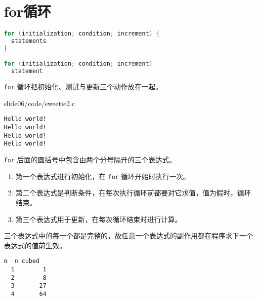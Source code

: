 \section{for循环}
\begin{frame}[fragile]\ft{\secname}
\begin{lstlisting}[language=c,frame=single]
for (initialization; condition; increment) {
  statements
}

for (initialization; condition; increment) 
  statement
\end{lstlisting} 

 \lstinline|for| 循环把初始化、测试与更新三个动作放在一起。

\end{frame}


\begin{frame}[fragile]\ft{\secname}
  
  {slide06/code/sweetie2.c}
\end{frame}


\begin{frame}[fragile]\ft{\secname}
\begin{lstlisting}[backgroundcolor=\color{red!10}]
Hello world!
Hello world!
Hello world!
Hello world!
\end{lstlisting} 
\end{frame}


\begin{frame}[fragile]\ft{\secname}
 \lstinline|for| 后面的圆括号中包含由两个分号隔开的三个表达式。\vspace{0.1in}

\begin{enumerate}
\item 第一个表达式进行初始化，在 \lstinline|for| 循环开始时执行一次。\\[0.1in]
\item 第二个表达式是判断条件，在每次执行循环前都要对它求值，值为假时，循环结束。\\[0.1in]
\item 第三个表达式用于更新，在每次循环结束时进行计算。\\[0.1in]
\end{enumerate}
三个表达式中的每一个都是完整的，故任意一个表达式的副作用都在程序求下一个表达式的值前生效。
\end{frame}

\begin{frame}[fragile]\ft{\secname}

\end{frame}

\begin{frame}[fragile]\ft{\secname}

\begin{lstlisting}[backgroundcolor=\color{red!10}]
  n  n cubed
  1        1
  2        8
  3       27
  4       64
\end{lstlisting}
\end{frame}

